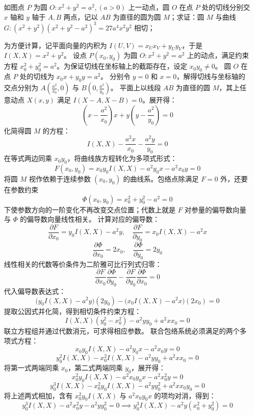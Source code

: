 \begin{example}
如图点 $P$ 为圆 $O: x^2 + y^2 = a^2, (a > 0)$ 上一动点，圆 $O$ 在点 $P$ 处的切线分别交 $x$ 轴和 $y$ 轴于 $A, B$ 两点，记以 $AB$ 为直径的圆为圆 $M$；求证：圆 $M$ 与曲线 $G: (x^2 + y^2)(x^2 + y^2 - a^2)^3 = 27a^4x^2y^2$ 相切；
\end{example}
\begin{solution}
为方便计算，记平面向量的内积为 $I(U,V) = x_U x_V + y_U y_V$，于是 $I(X, X) = x^2 + y^2$。
设点 $P(x_0, y_0)$ 为圆 $O: x^2 + y^2 = a^2$ 上的动点，满足约束方程 $x_0^2 + y_0^2 = a^2$。为保证切线在坐标轴上的截距存在，设定 $x_0 y_0 \neq 0$。
圆 $O$ 在点 $P$ 处的切线为 $x_0 x + y_0 y = a^2$。
分别令 $y = 0$ 和 $x = 0$，解得切线与坐标轴的交点分别为 $A\left(\frac{a^2}{x_0}, 0\right)$ 与 $B\left(0, \frac{a^2}{y_0}\right)$。
平面上以线段 $AB$ 为直径的圆 $M$，其上任意动点 $X(x,y)$ 满足 $I(X-A, X-B) = 0$。展开得：
$$ \left(x - \frac{a^2}{x_0}\right)x + y\left(y - \frac{a^2}{y_0}\right) = 0 $$
化简得圆 $M$ 的方程：
$$ I(X, X) - \frac{a^2 x}{x_0} - \frac{a^2 y}{y_0} = 0 $$
在等式两边同乘 $x_0 y_0$，将曲线族方程转化为多项式形式：
$$ F(x_0, y_0) = x_0 y_0 I(X, X) - a^2 y_0 x - a^2 x_0 y = 0 $$
将圆 $M$ 视作依赖于连续参数 $(x_0, y_0)$ 的曲线系。包络点除满足 $F=0$ 外，还要在参数约束
\[
\Phi(x_0,y_0)=x_0^2+y_0^2-a^2=0
\]
下使参数方向的一阶变化不再改变交点位置；代数上就是 $F$ 对参量的偏导数向量与 $\Phi$ 的偏导数向量线性相关。
计算对应的偏导数：
$$ \frac{\partial F}{\partial x_0} = y_0 I(X, X) - a^2 y, \quad \frac{\partial F}{\partial y_0} = x_0 I(X, X) - a^2 x $$
$$ \frac{\partial \Phi}{\partial x_0} = 2x_0, \quad \frac{\partial \Phi}{\partial y_0} = 2y_0 $$
线性相关的代数等价条件为二阶雅可比行列式归零：
$$ \frac{\partial F}{\partial x_0} \frac{\partial \Phi}{\partial y_0} - \frac{\partial F}{\partial y_0} \frac{\partial \Phi}{\partial x_0} = 0 $$
代入偏导数表达式：
$$ \big(y_0 I(X, X) - a^2 y\big)(2y_0) - \big(x_0 I(X, X) - a^2 x\big)(2x_0) = 0 $$
提取公因式并化简，得到相切条件约束方程：
$$ I(X, X)(y_0^2 - x_0^2) - a^2 y y_0 + a^2 x x_0 = 0 $$
联立方程组并通过代数消元，可求得相应参数。
联合包络系统必须满足的两个多项式方程：
$$ x_0 y_0 I(X, X) - a^2 y_0 x - a^2 x_0 y = 0 $$
$$ y_0^2 I(X, X) - x_0^2 I(X, X) - a^2 y y_0 + a^2 x x_0 = 0 $$
将第一式两端同乘 $x_0$，第二式两端同乘 $y_0$，展开得：
$$ x_0^2 y_0 I(X, X) - a^2 x_0 y_0 x - a^2 x_0^2 y = 0 $$
$$ y_0^3 I(X, X) - x_0^2 y_0 I(X, X) - a^2 y y_0^2 + a^2 x x_0 y_0 = 0 $$
将上述两式相加，含有 $x_0^2 y_0 I(X, X)$ 与 $a^2 x_0 y_0 x$ 的项均对消，得到：
$$ y_0^3 I(X, X) - a^2 x_0^2 y - a^2 y y_0^2 = 0 \implies y_0^3 I(X, X) - a^2 y (x_0^2 + y_0^2) = 0 $$

\end{solution}
